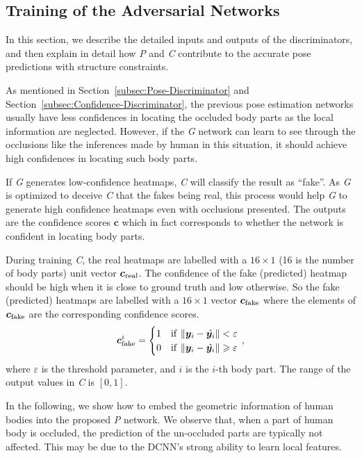 \documentclass[10pt,letterpaper,twocolumn]{article}
\begin{document}
\subsection{Training of the Adversarial Networks}\label{subsec:Geometric-Constrained-Training}

In this section, we describe the detailed inputs and outputs of the discriminators, and then explain in detail how \textit{P} and \textit{C} contribute to the accurate pose predictions with structure constraints.

As mentioned in Section~\ref{subsec:Pose-Discriminator} and Section~\ref{subsec:Confidence-Discriminator}, the previous pose estimation networks usually have less confidences in locating the occluded body parts as the local information are neglected. However, if the \textit{G} network can learn to see through the occlusions like the inferences made by human in this situation, it should  achieve high confidences in locating such body parts.


If \textit{G} generates low-confidence heatmaps, \textit{C} will classify the result as ``fake''. As \textit{G} is optimized to deceive \textit{C} that the fakes being real, this process would help \textit{G} to generate high confidence heatmaps even with occlusions presented. The outputs are the confidence scores $\bm{c}$ which in fact corresponds to whether the network is confident in locating body parts.

During training \textit{C}, the real heatmaps are labelled with  a $16\times 1$ (16 is the number of body parts) unit vector $\bm{c}_{\rm real}$. The confidence of the fake (predicted) heatmap should be high when it is close to ground truth and low otherwise. So the fake (predicted) heatmaps are labelled with a   $16\times 1$ vector $\bm{c}_{\rm fake}$ where the elements of $\bm{c}_{\rm fake}$ are the corresponding confidence scores.
\begin{equation}
\nonumber
\bm{c}_{\rm fake}^{i}=\begin{cases}
1 & {\rm if}\thinspace\left\Vert \bm{y}_{i}-\hat{\bm{y}_{i}}\right\Vert <\varepsilon\\
0 & {\rm if}\thinspace\left\Vert \bm{y}_{i}-\hat{\bm{y}_{i}}\right\Vert \geqslant\varepsilon
\end{cases}\,,
\end{equation}
where $\varepsilon$ is the threshold parameter, and $i$ is the $i$-th body part. The range of the output values in \textit{C} is $\left[0,1\right]$.

In the following, we show how to embed the geometric information of human bodies into the proposed \textit{P} network. We observe that, when a part of human body is occluded, the prediction of the un-occluded parts are typically not affected. This may be due to the DCNN's strong ability to learn local features.
\end{document}

